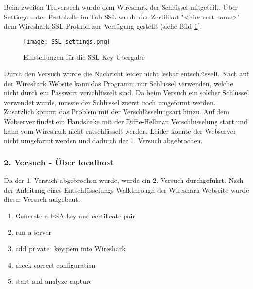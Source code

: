 	Beim zweiten Teilversuch wurde dem Wireshark der Schlüssel mitgeteilt. Über Settings unter Protokolle im Tab SSL wurde das Zertifikat "<hier cert name>" dem Wireshark SSL Protkoll zur Verfügung gestellt (siehe Bild \ref{fig:ssl_settings}).
	\begin{figure}[H]
		\centering
		\texttt{[image: SSL\_settings.png]}
		\caption{Einstellungen für die SSL Key Übergabe}
		\label{fig:ssl_settings}
	\end{figure}
	Durch den Versuch wurde die Nachricht leider nicht lesbar entschlüsselt. Nach  auf der Wireshark Website kann das Programm nur Schlüssel verwenden, welche nicht durch ein Passwort verschlüsselt sind. Da beim Versuch ein solcher Schlüssel verwendet wurde, musste der Schlüssel zuerst noch umgeformt werden.\\
	Zusätzlich kommt das Problem mit der Verschlüsselungsart hinzu. Auf dem Webserver findet ein Handshake mit der Diffie-Hellman Verschlüsselung statt und kann vom Wireshark nicht entschlüsselt werden. Leider konnte der Webserver nicht umgeformt werden und dadurch der 1. Versuch abgebrochen.\\
	
	\subsubsection{2. Versuch - Über localhost}
	Da der 1. Versuch abgebrochen wurde, wurde ein 2. Versuch durchgeführt. Nach der Anleitung eines Entschlüsselungs Walkthrough der Wireshark Webseite \cite{wireshark} wurde dieser Versuch aufgebaut.
	\begin{enumerate}
		\item Generate a RSA key and certificate pair
		\item run a server
		\item add private_key.pem into Wireshark
		\item check correct configuration
		\item start and analyze capture
	\end{enumerate}
	
